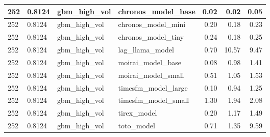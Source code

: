 {\begin{tabular}{llllrrr}
252 & 0.8124 & gbm\_high\_vol & chronos\_model\_base & 0.02 & 0.02 & 0.05 \\
\midrule
252 & 0.8124 & gbm\_high\_vol & chronos\_model\_mini & 0.20 & 0.18 & 0.23 \\
\midrule
252 & 0.8124 & gbm\_high\_vol & chronos\_model\_tiny & 0.24 & 0.18 & 0.25 \\
\midrule
252 & 0.8124 & gbm\_high\_vol & lag\_llama\_model & 0.70 & 10.57 & 9.47 \\
\midrule
252 & 0.8124 & gbm\_high\_vol & moirai\_model\_base & 0.08 & 0.98 & 1.41 \\
\midrule
252 & 0.8124 & gbm\_high\_vol & moirai\_model\_small & 0.51 & 1.05 & 1.53 \\
\midrule
252 & 0.8124 & gbm\_high\_vol & timesfm\_model\_large & 0.10 & 0.94 & 1.25 \\
\midrule
252 & 0.8124 & gbm\_high\_vol & timesfm\_model\_small & 1.30 & 1.94 & 2.08 \\
\midrule
252 & 0.8124 & gbm\_high\_vol & tirex\_model & 0.20 & 1.17 & 1.49 \\
\midrule
252 & 0.8124 & gbm\_high\_vol & toto\_model & 0.71 & 1.35 & 9.59 \\
\bottomrule
\end{tabular}
}
